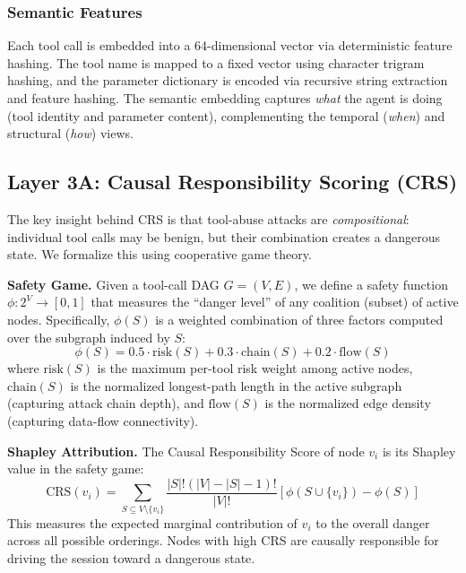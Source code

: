 \documentclass[conference,compsoc]{IEEEtran}
\begin{document}
\subsubsection{Semantic Features}
Each tool call is embedded into a 64-dimensional vector via deterministic feature hashing. The tool name is mapped to a fixed vector using character trigram hashing, and the parameter dictionary is encoded via recursive string extraction and feature hashing. The semantic embedding captures \emph{what} the agent is doing (tool identity and parameter content), complementing the temporal (\emph{when}) and structural (\emph{how}) views.

\subsection{Layer 3A: Causal Responsibility Scoring (CRS)}
\label{sec:crs}

The key insight behind CRS is that tool-abuse attacks are \emph{compositional}: individual tool calls may be benign, but their combination creates a dangerous state. We formalize this using cooperative game theory.

\textbf{Safety Game.} Given a tool-call DAG $G = (V, E)$, we define a safety function $\phi: 2^V \to [0, 1]$ that measures the ``danger level'' of any coalition (subset) of active nodes. Specifically, $\phi(S)$ is a weighted combination of three factors computed over the subgraph induced by $S$:
\begin{equation}
\phi(S) = 0.5 \cdot \text{risk}(S) + 0.3 \cdot \text{chain}(S) + 0.2 \cdot \text{flow}(S)
\end{equation}
where $\text{risk}(S)$ is the maximum per-tool risk weight among active nodes, $\text{chain}(S)$ is the normalized longest-path length in the active subgraph (capturing attack chain depth), and $\text{flow}(S)$ is the normalized edge density (capturing data-flow connectivity).

\textbf{Shapley Attribution.} The Causal Responsibility Score of node $v_i$ is its Shapley value in the safety game:
\begin{equation}
\text{CRS}(v_i) = \sum_{S \subseteq V \setminus \{v_i\}} \frac{|S|!(|V|-|S|-1)!}{|V|!} \left[\phi(S \cup \{v_i\}) - \phi(S)\right]
\end{equation}
This measures the expected marginal contribution of $v_i$ to the overall danger across all possible orderings. Nodes with high CRS are causally responsible for driving the session toward a dangerous state.
\end{document}
